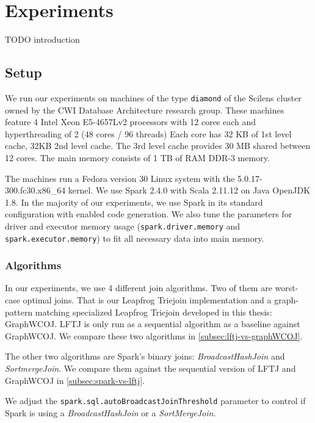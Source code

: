 \section{Experiments}\label{sec:experiments}

TODO introduction

\subsection{Setup} \label{subsec:experimental-setup}

We run our experiments on machines of the type \texttt{diamond} of the Scilens cluster owned by the CWI Database Architecture research
group.
These machines feature 4 Intel Xeon E5-4657Lv2 processors with 12 cores each and hyperthreading of 2 (48 cores / 96 threads)
Each core has 32 KB of 1st level cache, 32KB 2nd level cache.
The 3rd level cache provides 30 MB shared between 12 cores.
The main memory consists of 1 TB of RAM DDR-3 memory.

The machines run a Fedora version 30 Linux system with the 5.0.17-300.fc30.x86\_64 kernel.
We use Spark 2.4.0 with Scala 2.11.12 on Java OpenJDK 1.8.
In the majority of our experiments, we use Spark in its standard configuration with enabled code generation.
We also tune the parameters for driver and executor memory usage (\texttt{spark.driver.memory} and \texttt{spark.executor.memory}) to fit
all necessary data into main memory.

\subsubsection{Algorithms}

In our experiments, we use 4 different join algorithms.
Two of them are worst-case optimal joins.
That is our Leapfrog Triejoin implementation and a graph-pattern matching
specialized Leapfrog Triejoin developed in this thesis: Graph\textsc{WCOJ}.
LFTJ is only run as a sequential algorithm as a baseline against GraphWCOJ.
We compare these two algorithms in \cref{subsec:lftj-vs-graphWCOJ}.

The other two algorithms are Spark's binary joins: \textit{BroadcastHashJoin} and \textit{SortmergeJoin}.
We compare them against the sequential version of \textsc{LFTJ} and GraphWCOJ in \cref{subsec:spark-vs-lftj}.

We adjust the \texttt{spark.sql.autoBroadcastJoinThreshold} parameter to control
if Spark is using a \textit{BroadcastHashJoin} or a \textit{SortMergeJoin}.

